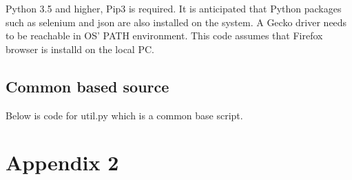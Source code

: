 \documentclass[a4paper,12pt]{article}
\begin{document}
Python 3.5 and higher, Pip3 is required. It is anticipated that Python packages such as selenium and json are also installed on the system. A Gecko driver needs to be reachable in OS' PATH environment. This code assumes that Firefox browser is installd on the local PC.

\subsection{Common based source}
Below is code for util.py which is a common base script.
\newpage

\section{Appendix 2}\label{protocol-verification}

\end{document}
